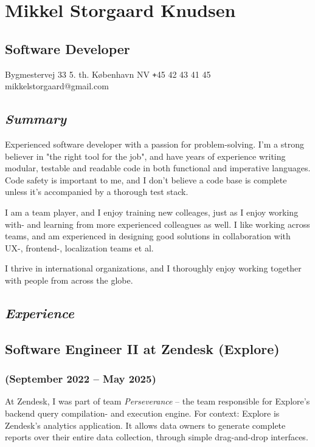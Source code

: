 \documentclass[10pt, a4paper]{article}
\begin{document}
\section*{Mikkel Storgaard Knudsen}
\subsection*{Software Developer}
Bygmestervej 33 5. th.  København NV \newline
\texttt{+}45 42 43 41 45 \newline
mikkelstorgaard@gmail.com
\subsection*{\textit{Summary}}
Experienced software developer with a passion for problem-solving. I'm a strong believer in "the right tool for the job", and have years of experience writing modular, testable and readable code in both functional and imperative languages.
Code safety is important to me, and I don't believe a code base is complete unless it's accompanied by a thorough test stack.

I am a team player, and I enjoy training new colleages, just as I enjoy working with- and learning from more experienced colleagues as well.
I like working across teams, and am experienced in designing good solutions in collaboration with UX-, frontend-, localization teams et al.

I thrive in international organizations, and I thoroughly enjoy working together with people from across the globe.

\subsection*{\textit{Experience}}
\subsection*{Software Engineer II at Zendesk (Explore)}
\subsubsection*{{\normalfont(September 2022 -- May 2025)}}
At Zendesk, I was part of team \textit{Perseverance} -- the team responsible for Explore's backend query compilation- and execution engine. 
For context: Explore is Zendesk's analytics application. It allows data owners to generate complete reports over their entire data collection, through simple drag-and-drop interfaces.
\end{document}
